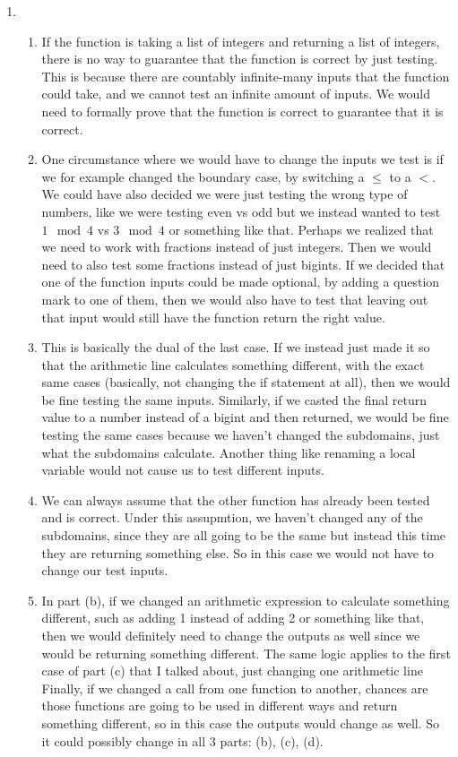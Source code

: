 \documentclass[12pt]{article}
\theoremstyle{definitionstyle}
\begin{document}
\begin{enumerate}[leftmargin=\labelsep]
        \newpage
        \item \begin{enumerate}[label=(\alph*)]
            \item If the function is taking a list of integers and returning a list of integers, there is no way to guarantee that the function is correct by just testing. This is because there are countably infinite-many inputs that the function could take, and we cannot test an infinite amount of inputs. We would need to formally prove that the function is correct to guarantee that it is correct.
            \item One circumstance where we would have to change the inputs we test is if we for example changed the boundary case, by switching a $\leq$ to a $<$. We could have also decided we were just testing the wrong type of numbers, like we were testing even vs odd but we instead wanted to test $1 \mod 4$ vs $3 \mod 4$ or something like that. Perhaps we realized that we need to work with fractions instead of just integers. Then we would need to also test some fractions instead of just bigints. If we decided that one of the function inputs could be made optional, by adding a question mark to one of them, then we would also have to test that leaving out that input would still have the function return the right value. 
            \item This is basically the dual of the last case. If we instead just made it so that the arithmetic line calculates something different, with the exact same cases (basically, not changing the if statement at all), then we would be fine testing the same inputs. Similarly, if we casted the final return value to a number instead of a bigint and then returned, we would be fine testing the same cases because we haven't changed the subdomains, just what the subdomains calculate. Another thing like renaming a local variable would not cause us to test different inputs. 
            \item We can always assume that the other function has already been tested and is correct. Under this assupmtion, we haven't changed any of the subdomains, since they are all going to be the same but instead this time they are returning something else. So in this case we would not have to change our test inputs. 
            \item In part (b), if we changed an arithmetic expression to calculate something different, such as adding 1 instead of adding 2 or something like that, then we would definitely need to change the outputs as well since we would be returning something different. The same logic applies to the first case of part (c) that I talked about, just changing one arithmetic line Finally, if we changed a call from one function to another, chances are those functions are going to be used in different ways and return something different, so in this case the outputs would change as well. So it could possibly change in all 3 parts: (b), (c), (d).  
        \end{enumerate}


\end{enumerate}
\end{document}
